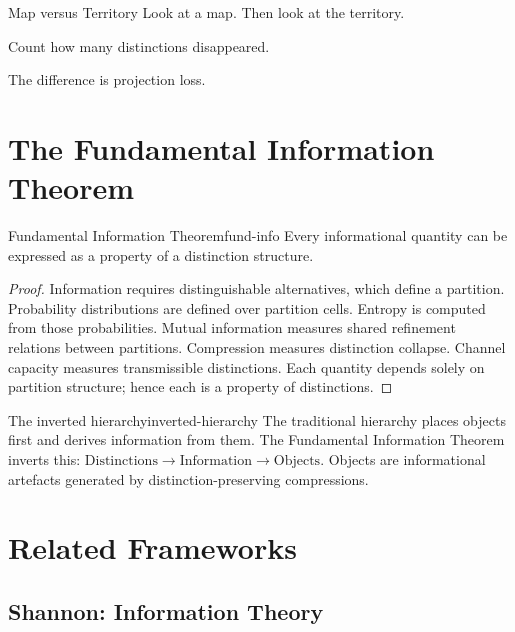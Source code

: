 \documentclass[12pt,twoside,openright]{book}
\begin{document}
\begin{distinctionaside}{Map versus Territory}
Look at a map. Then look at the territory.

Count how many distinctions disappeared.

The difference is projection loss.
\end{distinctionaside}

\section{The Fundamental Information Theorem}
\label{sec:ch2-fund}

\begin{theorem}{Fundamental Information Theorem}{fund-info}
  Every informational quantity can be expressed as a
  property of a distinction structure.
\end{theorem}

\begin{proof}
  Information requires distinguishable alternatives, which
  define a partition. Probability distributions are defined
  over partition cells. Entropy is computed from those
  probabilities. Mutual information measures shared
  refinement relations between partitions. Compression
  measures distinction collapse. Channel capacity measures
  transmissible distinctions. Each quantity depends solely
  on partition structure; hence each is a property of
  distinctions.
\end{proof}

\begin{remark}{The inverted hierarchy}{inverted-hierarchy}
  The traditional hierarchy places objects first and
  derives information from them. The Fundamental
  Information Theorem inverts this:
  $\text{Distinctions} \to \text{Information} \to \text{Objects}$.
  Objects are informational artefacts generated by
  distinction-preserving compressions.
\end{remark}

\section{Related Frameworks}
\label{sec:ch2-related-frameworks}

\subsection*{Shannon: Information Theory}
\end{document}
